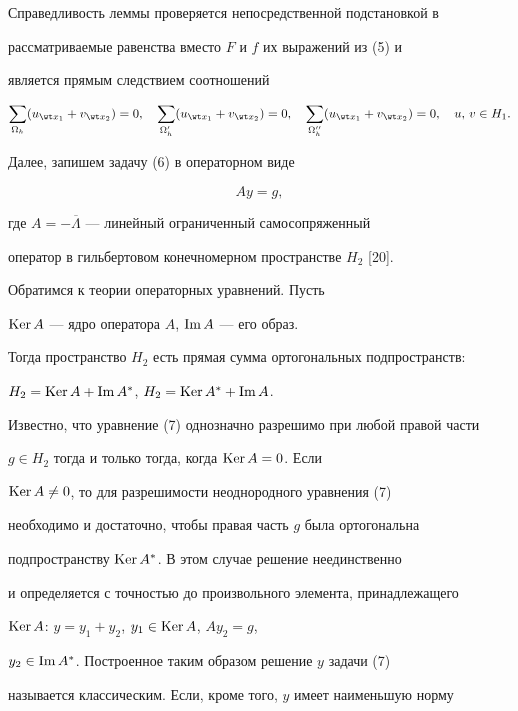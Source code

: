 Справедливость леммы проверяется непосредственной подстановкой в


рассматриваемые равенства вместо $F$ и $f$ их выражений из (5) и


является прямым следствием соотношений


$$


\sum_{\Omega_h}(u_{\wt x_1}+v_{\wt x_2})=0,\quad


\sum_{\Omega_h'}(u_{\wt x_1}+v_{\wt x_2})=0,\quad


\sum_{\Omega_h''}(u_{\wt x_1}+v_{\wt x_2})=0,\quad


u,\,v\in H_1.


$$





Далее, запишем задачу (6) в операторном виде


\begin{equation}


Ay=g,


\end{equation}


где $A=-\overline\Lambda$ --- линейный ограниченный самосопряженный


оператор в гильбертовом конечномерном пространстве $H_2$ [20].


Обратимся к теории операторных уравнений. Пусть


$\operatorname{Ker} A$ --- ядро оператора $A$, $\operatorname{Im} A$ --- его образ.


Тогда пространство $H_2$ есть прямая сумма ортогональных подпространств:


$H_2=\operatorname{Ker} A+\operatorname{Im} A^*$, $H_2=\operatorname{Ker} A^*+\operatorname{Im} A$.


Известно, что уравнение (7) однозначно разрешимо при любой правой части


$g\in H_2$ тогда и только тогда, когда $\operatorname{Ker} A=0$. Если


$\operatorname{Ker} A\ne 0$, то для разрешимости неоднородного уравнения (7)


необходимо и достаточно, чтобы правая часть $g$ была ортогональна


подпространству $\operatorname{Ker} A^*$. В этом случае решение неединственно


и определяется с точностью до произвольного элемента, принадлежащего


$\operatorname{Ker} A$: $y=y_1+y_2$, $y_1\in\operatorname{Ker} A$, $Ay_2=g$,


$y_2\in\operatorname{Im} A^*$. Построенное таким образом решение $y$ задачи (7)


называется классическим. Если, кроме того, $y$ имеет наименьшую норму


